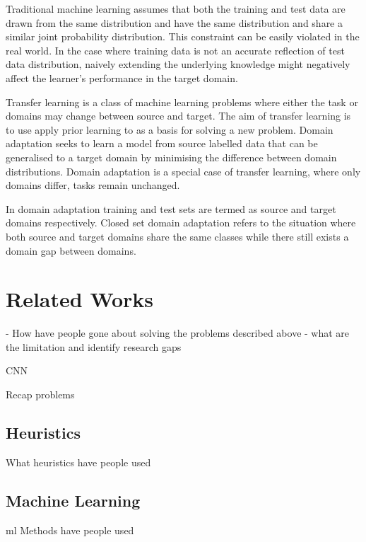 Traditional machine learning assumes that both the training and test data are drawn from the same distribution and have the same distribution and share a similar joint probability distribution. This constraint can be easily violated in the real world. In the case where training data is not an accurate reflection of test data distribution, naively extending the underlying knowledge might negatively affect the learner's performance in the target domain.\cite{Farahani2021}

Transfer learning is a class of machine learning problems where either the task or domains may change between source and target. The aim of transfer learning is to use apply prior learning to as a basis for solving a new problem. Domain adaptation seeks to learn a model from source labelled data that can be generalised to a target domain by minimising the difference between domain distributions. Domain adaptation is a special case of transfer learning, where only domains differ, tasks remain unchanged.\cite{Farahani2021}

In domain adaptation training and test sets are termed as source and target domains respectively. Closed set domain adaptation refers to the situation where both source and target domains share the same classes while there still exists a domain gap between domains.\cite{Farahani2021}



\section{Related Works} - %
How have people gone about solving the problems described above - what are the limitation and identify research gaps

CNN \cite{Martinez-Hernandez2021}

Recap problems


\subsection{Heuristics}
What heuristics have people used

\subsection{Machine Learning} %
\acrshort{ml} Methods have people used


